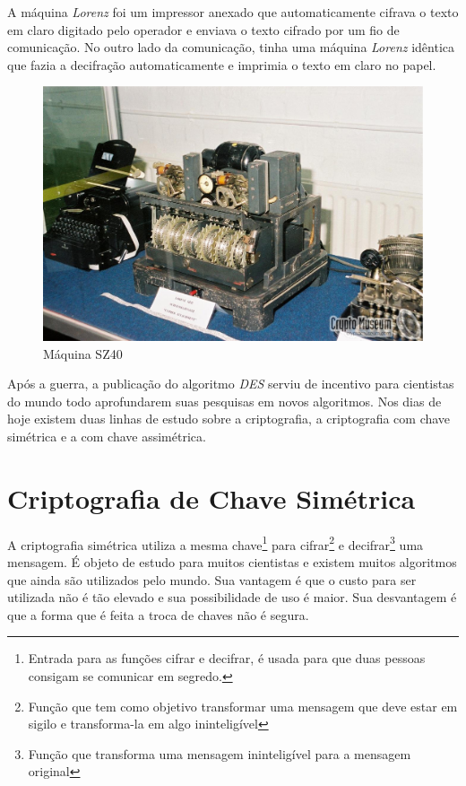 A máquina \textit{Lorenz} foi um impressor anexado que automaticamente cifrava o texto em claro digitado pelo operador e enviava o texto cifrado por um fio de comunicação. No outro lado da comunicação, tinha uma máquina \textit{Lorenz} idêntica que fazia a decifração automaticamente e imprimia o texto em claro no papel. ~\cite{chris-collins}

\begin{figure}[h]
  \centering
  \includegraphics[keepaspectratio=true,scale=0.2]
  {figuras/sz40.eps}
  \caption[{Máquina SZ40}]{Máquina SZ40\protect\footnotemark}
    \label{sz40-machine}
\end{figure}

Após a guerra, a publicação do algoritmo \textit{DES} serviu de incentivo para cientistas do mundo todo aprofundarem suas pesquisas em novos algoritmos. Nos dias de hoje existem duas linhas de estudo sobre a criptografia, a criptografia com chave simétrica e a com chave assimétrica. 


\section{Criptografia de Chave Simétrica}
\label{symmetric-cryptography}

A criptografia simétrica utiliza a mesma chave\footnote{Entrada para as funções cifrar e decifrar, é usada para que duas pessoas consigam se comunicar em segredo.} para cifrar\footnote{Função que tem como objetivo transformar uma mensagem que deve estar em sigilo e transforma-la em algo ininteligível} e decifrar\footnote{Função que transforma uma mensagem ininteligível para a mensagem original} uma mensagem. É objeto de estudo para muitos cientistas e existem muitos algoritmos que ainda são utilizados pelo mundo. Sua vantagem é que o custo para ser utilizada não é tão elevado e sua possibilidade de uso é maior. Sua desvantagem é que a forma que é feita a troca de chaves não é segura.

